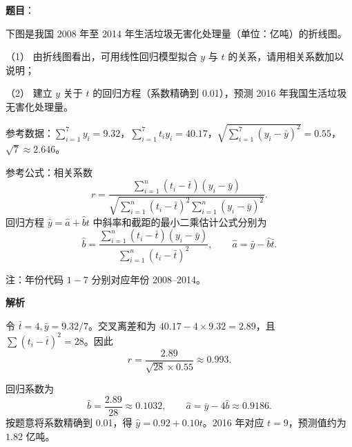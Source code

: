 \begin{answer}

\textbf{题目}：

下图是我国 2008 年至 2014 年生活垃圾无害化处理量（单位：亿吨）的折线图。

（1） 由折线图看出，可用线性回归模型拟合 \(y\) 与 \(t\) 的关系，请用相关系数加以说明；

（2） 建立 \(y\) 关于 \(t\) 的回归方程（系数精确到 0.01），预测 2016 年我国生活垃圾无害化处理量。

参考数据：\(\displaystyle\sum_{i=1}^7 y_i=9.32\)，\(\displaystyle\sum_{i=1}^7t_i y_i=40.17\)，\(\displaystyle\sqrt{\sum_{i=1}^7(y_i-\bar y)^2}=0.55\)，\(\sqrt7\approx2.646\)。

参考公式：相关系数
\nopagebreak[4]
\[
r=\frac{\displaystyle\sum_{i=1}^n(t_i-\bar t)(y_i-\bar y)}{\sqrt{\displaystyle\sum_{i=1}^n(t_i-\bar t)^2\displaystyle\sum_{i=1}^n(y_i-\bar y)^2}}.
\]
回归方程 \(\hat y=\hat a+\hat bt\) 中斜率和截距的最小二乘估计公式分别为
\nopagebreak[4]
\[
\hat b=\frac{\displaystyle\sum_{i=1}^n(t_i-\bar t)(y_i-\bar y)}{\displaystyle\sum_{i=1}^n(t_i-\bar t)^2},\qquad \hat a=\bar y-\hat b\bar t.
\]

注：年份代码 \(1-7\) 分别对应年份 2008–2014。
\nopagebreak[4]
\begin{center}\end{center}
\nopagebreak[4]
\textbf{解析}


令 \(\bar t=4,\bar y=9.32/7\)。交叉离差和为 \(40.17-4\times9.32=2.89\)，且 \(\sum(t_i-\bar t)^2=28\)。因此
\nopagebreak[4]
\[
r=\frac{2.89}{\sqrt{28}\times0.55}\approx0.993.
\]


回归系数为
\nopagebreak[4]
\[
\hat b=\frac{2.89}{28}\approx0.1032,\qquad
\hat a=\bar y-4\hat b\approx0.9186.
\]
按题意将系数精确到 0.01，得 \(\hat y=0.92+0.10t\)。2016 年对应 \(t=9\)，预测值约为 \(1.82\) 亿吨。



\end{answer}
